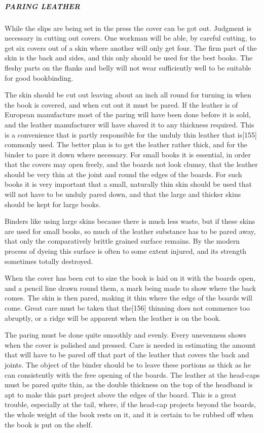 \documentclass[
]{article}
\begin{document}
\hypertarget{paring-leather}{%
\subparagraph{PARING LEATHER}\label{paring-leather}}

While the slips are being set in the press the cover can be got out.
Judgment is necessary in cutting out covers. One workman will be able,
by careful cutting, to get six covers out of a skin where another will
only get four. The firm part of the skin is the back and sides, and this
only should be used for the best books. The fleshy parts on the flanks
and belly will not wear sufficiently well to be suitable for good
bookbinding.

The skin should be cut out leaving about an inch all round for turning
in when the book is covered, and when cut out it must be pared. If the
leather is of European manufacture most of the paring will have been
done before it is sold, and the leather manufacturer will have shaved it
to any thickness required. This is a convenience that is partly
responsible for the unduly thin leather that
is{\protect\hypertarget{Page_155}{}{{[}155{]}}} commonly used. The
better plan is to get the leather rather thick, and for the binder to
pare it down where necessary. For small books it is essential, in order
that the covers may open freely, and the boards not look clumsy, that
the leather should be very thin at the joint and round the edges of the
boards. For such books it is very important that a small, naturally thin
skin should be used that will not have to be unduly pared down, and that
the large and thicker skins should be kept for large books.

Binders like using large skins because there is much less waste, but if
these skins are used for small books, so much of the leather substance
has to be pared away, that only the comparatively brittle grained
surface remains. By the modern process of dyeing this surface is often
to some extent injured, and its strength sometimes totally destroyed.

When the cover has been cut to size the book is laid on it with the
boards open, and a pencil line drawn round them, a mark being made to
show where the back comes. The skin is then pared, making it thin where
the edge of the boards will come. Great care must be taken that
the{\protect\hypertarget{Page_156}{}{{[}156{]}}} thinning does not
commence too abruptly, or a ridge will be apparent when the leather is
on the book.

The paring must be done quite smoothly and evenly. Every unevenness
shows when the cover is polished and pressed. Care is needed in
estimating the amount that will have to be pared off that part of the
leather that covers the back and joints. The object of the binder should
be to leave these portions as thick as he can consistently with the free
opening of the boards. The leather at the head-caps must be pared quite
thin, as the double thickness on the top of the headband is apt to make
this part project above the edges of the board. This is a great trouble,
especially at the tail, where, if the head-cap projects beyond the
boards, the whole weight of the book rests on it, and it is certain to
be rubbed off when the book is put on the shelf.
\end{document}
